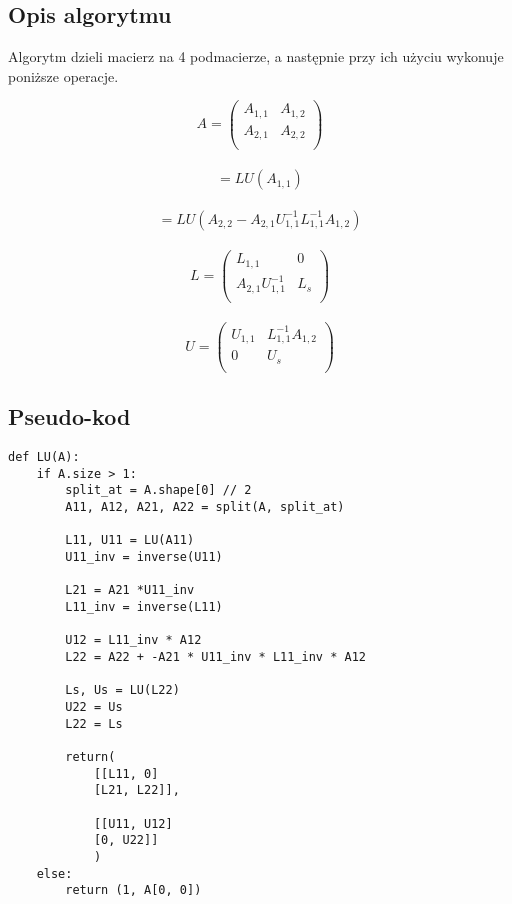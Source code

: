 \documentclass{article}
\begin{document}
\subsection{Opis algorytmu}
\qquad Algorytm dzieli macierz na 4 podmacierze, a następnie przy ich użyciu wykonuje poniższe operacje.

\begin{equation}
A = 
     \begin{pmatrix}
      A_{1,1} & A_{1,2}  \\
      A_{2,1} & A_{2,2} \\
     \end{pmatrix}
\end{equation}\\
\begin{equation}
[L_{1,1}, U_{1,1}] = LU(A_{1,1})
\end{equation}\\
\begin{equation}
[L_s, U_s]
= LU(A_{2,2} - A_{2,1}U_{1,1}^{-1}L_{1,1}^{-1}A_{1,2})
\end{equation}\\
\begin{equation}
L = 
    \begin{pmatrix}
        L_{1,1} & 0  \\         A_{2,1}U_{1,1}^{-1} & L_s \\
    \end{pmatrix}
\end{equation}\\
\begin{equation}
U = 
    \begin{pmatrix}
        U_{1,1} &  L_{1,1}^{-1}A_{1,2} \\         0 & U_s \\
    \end{pmatrix}
\end{equation}
\subsection{Pseudo-kod}
\begin{lstlisting}
def LU(A):
    if A.size > 1:
        split_at = A.shape[0] // 2
        A11, A12, A21, A22 = split(A, split_at)

        L11, U11 = LU(A11)
        U11_inv = inverse(U11)

        L21 = A21 *U11_inv
        L11_inv = inverse(L11)

        U12 = L11_inv * A12
        L22 = A22 + -A21 * U11_inv * L11_inv * A12

        Ls, Us = LU(L22)
        U22 = Us
        L22 = Ls

        return(
            [[L11, 0]
            [L21, L22]],
            
            [[U11, U12]
            [0, U22]]
            )
    else:
        return (1, A[0, 0])
\end{lstlisting}
\end{document}
